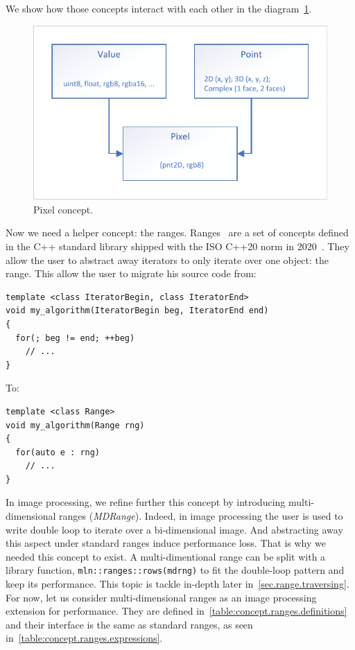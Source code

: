 We show how those concepts interact with each other in the diagram~\cref{fig:concept.pixel}.

\begin{figure}[tbh]
  \centering
  \includegraphics[width=.8\linewidth]{figs/concepts/pixel.pdf}
  \caption{Pixel concept.}
  \label{fig:concept.pixel}
\end{figure}

Now we need a helper concept: the ranges.
Ranges~\parencite{niebler.2014.ranges,niebler.2018.ranges,niebler.2018.deepranges,niebler.2018.mergingranges} are a set
of concepts defined in the C++ standard library shipped with the ISO C++20 norm in 2020~\parencite{iso.2020.cpp}. They
allow the user to abstract away iterators to only iterate over one object: the range. This allow the user to migrate his
source code from:
\begin{verbatim}
template <class IteratorBegin, class IteratorEnd>
void my_algorithm(IteratorBegin beg, IteratorEnd end)
{
  for(; beg != end; ++beg)
    // ...
}
\end{verbatim}
To:
\begin{verbatim}
template <class Range>
void my_algorithm(Range rng)
{
  for(auto e : rng)
    // ...
}
\end{verbatim}

In image processing, we refine further this concept by introducing multi-dimensional ranges (\emph{MDRange}). Indeed, in
image processing the user is used to write double loop to iterate over a bi-dimensional image. And abstracting away this
aspect under standard ranges induce performance loss. That is why we needed this concept to exist. A multi-dimentional
range can be split with a library function, \texttt{mln::ranges::rows(mdrng)} to fit the double-loop pattern and keep
its performance. This topic is tackle in-depth later in~\cref{sec.range.traversing}. For now, let us consider
multi-dimensional ranges as an image processing extension for performance. They are defined
in~\cref{table:concept.ranges.definitions} and their interface is the same as standard ranges, as seen
in~\cref{table:concept.ranges.expressions}.


